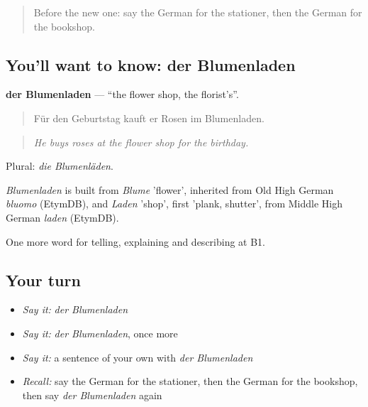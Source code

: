 \label{lesson:GE-C444-blumenladen}



\begin{quote}
Before the new one: say the German for the stationer, then the German for the bookshop.
\end{quote}

\subsection*{You'll want to know: der Blumenladen}
\textbf{der Blumenladen} — \textquotedblleft{}the flower shop, the florist's\textquotedblright{}.

\begin{quote}
Für den Geburtstag kauft er Rosen im Blumenladen.
\end{quote}

\begin{quote}
\emph{He buys roses at the flower shop for the birthday.}
\end{quote}

Plural: \emph{die Blumenläden}.

\begin{cousinweb}
\emph{Blumenladen} is built from \emph{Blume} 'flower', inherited from Old High German \emph{bluomo} (EtymDB), and \emph{Laden} 'shop', first 'plank, shutter', from Middle High German \emph{laden} (EtymDB).
\end{cousinweb}

\begin{grammarlens}[title={What you've built}]
One more word for telling, explaining and describing at B1.
\end{grammarlens}

\subsection*{Your turn}
\begin{itemize}
\raggedright
  \item \emph{Say it:} \emph{der Blumenladen}
  \item \emph{Say it:} \emph{der Blumenladen}, once more
  \item \emph{Say it:} a sentence of your own with \emph{der Blumenladen}
  \item \emph{Recall:} say the German for the stationer, then the German for the bookshop, then say \emph{der Blumenladen} again
\end{itemize}

